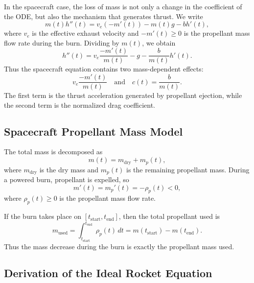 ﻿\documentclass[12pt]{article}
\begin{document}
In the spacecraft case, the loss of mass is not only a change in the coefficient of the ODE, but also the mechanism that generates thrust.
We write
\[
 m(t)h''(t) = v_e(-m'(t)) - m(t)g - bh'(t),
\]
where $v_e$ is the effective exhaust velocity and $-m'(t)\ge0$ is the propellant mass flow rate during the burn. Dividing by $m(t)$, we obtain
\[
 h''(t)
 =
 v_e\frac{-m'(t)}{m(t)}
 -g
 -\frac{b}{m(t)}h'(t).
\]
Thus the spacecraft equation contains two mass-dependent effects:
\[
 v_e\frac{-m'(t)}{m(t)}
 \quad\text{and}\quad
 c(t) = \frac{b}{m(t)}.
\]
The first term is the thrust acceleration generated by propellant ejection, while the second term is the normalized drag coefficient.

\subsection{Spacecraft Propellant Mass Model}
The total mass is decomposed as
\[
 m(t) = m_{\mathrm{dry}} + m_p(t),
\]
where $m_{\mathrm{dry}}$ is the dry mass and $m_p(t)$ is the remaining propellant mass. 
During a powered burn, propellant is expelled, so
\[
 m'(t) = m_p'(t) = -\rho_p(t) < 0,
\]
where $\rho_p(t)\ge0$ is the propellant mass flow rate.

If the burn takes place on $[t_{\mathrm{start}}, t_{\mathrm{end}}]$, then the total propellant used is
\[
 m_{\mathrm{used}}
 = \int_{t_{\mathrm{start}}}^{t_{\mathrm{end}}}\rho_p(t)\, dt
 =
 m(t_{\mathrm{start}}) - m(t_{\mathrm{end}}).
\]
Thus the mass decrease during the burn is exactly the propellant mass used.
\subsection{Derivation of the Ideal Rocket Equation}
\end{document}
